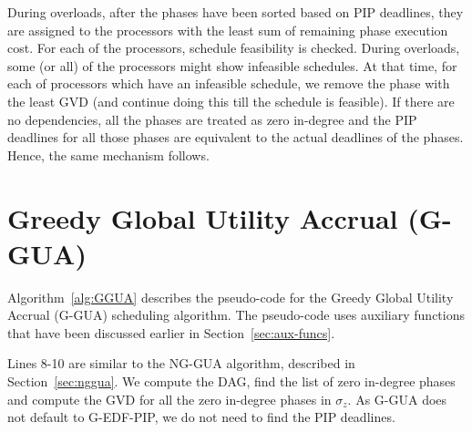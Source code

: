 \documentclass[12pt,dvips]{report}
\begin{document}
During overloads, after the phases have been sorted based on PIP deadlines, they are assigned to the processors with the least sum of remaining phase execution cost. For each of the processors, schedule feasibility is checked. During overloads, some (or all) of the processors might show infeasible schedules. At that time, for each of processors which have an infeasible schedule, we remove the phase with the least GVD (and continue doing this till the schedule is feasible). If there are no dependencies, all the phases are treated as zero in-degree and the PIP deadlines for all those phases are equivalent to the actual deadlines of the phases. Hence, the same mechanism follows.

\section{Greedy Global Utility Accrual (G-GUA)}

Algorithm~\ref{alg:GGUA} describes the pseudo-code for the Greedy Global Utility Accrual (G-GUA) scheduling algorithm. The pseudo-code uses auxiliary functions that have been discussed earlier in Section~\ref{sec:aux-funcs}.

Lines 8-10 are similar to the NG-GUA algorithm, described in Section~\ref{sec:nggua}. We compute the DAG, find the list of zero in-degree phases and compute the GVD for all the zero in-degree phases in $\sigma_z$. As G-GUA does not default to G-EDF-PIP, we do not need to find the PIP deadlines. 
\end{document}
